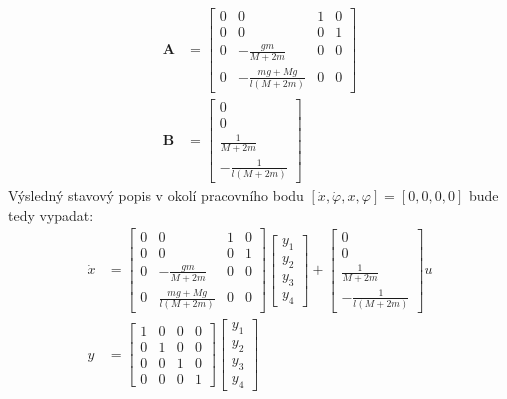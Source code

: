\documentclass[a4paper, 12pt]{article}
\begin{document}
			\begin{align*}
				\mathbf{A} &= \left[\begin{matrix}
					0 & 0 & 1 & 0\\
					0 & 0 & 0 & 1\\
					0 & -\frac{gm}{M+2m} & 0 & 0\\
					0 & -\frac{mg+Mg}{l\left(M+2m\right)} & 0 & 0
				\end{matrix}\right]\\
				\mathbf{B} &= \left[\begin{matrix}
					0\\
					0\\
					\frac{1}{M+2m}\\
					-\frac{1}{l\left(M+2m\right)}
				\end{matrix}\right]
			\end{align*}
			Výsledný stavový popis v okolí pracovního bodu $\left[\dot{x}, \dot{\varphi}, x, \varphi\right]=\left[0, 0, 0, 0\right]$ bude tedy vypadat:
			\begin{align*}
				\dot{x}&=\left[\begin{matrix}
					0 & 0 & 1 & 0\\
					0 & 0 & 0 & 1\\
					0 & -\frac{gm}{M+2m} & 0 & 0\\
					0 & \frac{mg+Mg}{l\left(M+2m\right)} & 0 & 0
				\end{matrix}\right]
				\left[\begin{matrix}
					y_1\\
					y_2\\
					y_3\\
					y_4
				\end{matrix}\right]
				+
				\left[\begin{matrix}
					0\\
					0\\
					\frac{1}{M+2m}\\
					-\frac{1}{l\left(M+2m\right)}
				\end{matrix}\right]u\\
				y&=\left[\begin{matrix}
					1 & 0 & 0 & 0\\
					0 & 1 & 0 & 0\\
					0 & 0 & 1 & 0\\
					0 & 0 & 0 & 1
				\end{matrix}\right]
				\left[\begin{matrix}
					y_1\\
					y_2\\
					y_3\\
					y_4
				\end{matrix}\right]
			\end{align*}
\end{document}
